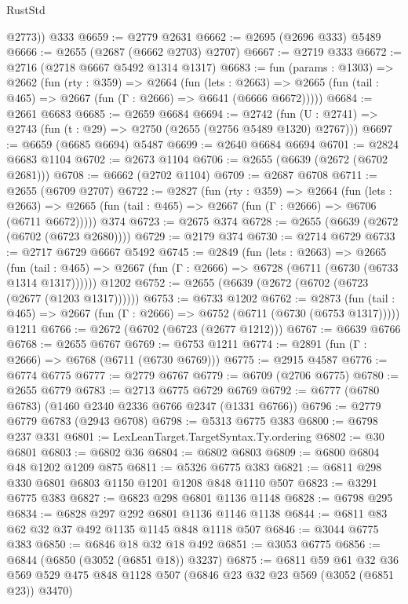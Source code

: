 \begin{lexlean}{RustStd}
\begin{coremodule}
        @2773))
    @333
@6659 := @2779 @2631
@6662 := @2695 (@2696 @333) @5489
@6666 := @2655 (@2687 (@6662 @2703) @2707)
@6667 := @2719 @333
@6672 := @2716 (@2718 @6667 @5492 @1314 @1317)
@6683 := fun (params : @1303) =>
  @2662
    (fun (rty : @359) =>
    @2664
      (fun (lets : @2663) =>
      @2665 (fun (tail : @465) => @2667 (fun (Γ : @2666) => @6641 (@6666 @6672)))))
@6684 := @2661 @6683
@6685 := @2659 @6684
@6694 := @2742 (fun (U : @2741) => @2743 (fun (t : @29) => @2750 (@2655 (@2756 @5489 @1320) @2767)))
@6697 := @6659 (@6685 @6694) @5487
@6699 := @2640 @6684 @6694
@6701 := @2824 @6683 @1104
@6702 := @2673 @1104
@6706 := @2655 (@6639 (@2672 (@6702 @2681)))
@6708 := @6662 (@2702 @1104)
@6709 := @2687 @6708
@6711 := @2655 (@6709 @2707)
@6722 := @2827
    (fun (rty : @359) =>
    @2664
      (fun (lets : @2663) =>
      @2665 (fun (tail : @465) => @2667 (fun (Γ : @2666) => @6706 (@6711 @6672)))))
    @374
@6723 := @2675 @374
@6728 := @2655 (@6639 (@2672 (@6702 (@6723 @2680))))
@6729 := @2179 @374
@6730 := @2714 @6729
@6733 := @2717 @6729 @6667 @5492
@6745 := @2849
    (fun (lets : @2663) =>
    @2665
      (fun (tail : @465) => @2667 (fun (Γ : @2666) => @6728 (@6711 (@6730 (@6733 @1314 @1317))))))
    @1202
@6752 := @2655 (@6639 (@2672 (@6702 (@6723 (@2677 (@1203 @1317))))))
@6753 := @6733 @1202
@6762 := @2873
    (fun (tail : @465) => @2667 (fun (Γ : @2666) => @6752 (@6711 (@6730 (@6753 @1317)))))
    @1211
@6766 := @2672 (@6702 (@6723 (@2677 @1212)))
@6767 := @6639 @6766
@6768 := @2655 @6767
@6769 := @6753 @1211
@6774 := @2891 (fun (Γ : @2666) => @6768 (@6711 (@6730 @6769)))
@6775 := @2915 @4587
@6776 := @6774 @6775
@6777 := @2779 @6767
@6779 := @6709 (@2706 @6775)
@6780 := @2655 @6779
@6783 := @2713 @6775 @6729 @6769
@6792 := @6777 (@6780 @6783) (@1460 @2340 @2336 @6766 @2347 (@1331 @6766))
@6796 := @2779 @6779 @6783 (@2943 @6708)
@6798 := @5313 @6775 @383
@6800 := @6798 @237 @331
@6801 := LexLeanTarget.TargetSyntax.Ty.ordering
@6802 := @30 @6801
@6803 := @6802 @36
@6804 := @6802 @6803
@6809 := @6800 @6804 @48 @1202 @1209 @875
@6811 := @5326 @6775 @383
@6821 := @6811 @298 @330 @6801 @6803 @1150 @1201 @1208 @848 @1110 @507
@6823 := @3291 @6775 @383
@6827 := @6823 @298 @6801 @1136 @1148
@6828 := @6798 @295
@6834 := @6828 @297 @292 @6801 @1136 @1146 @1138
@6844 := @6811 @83 @62 @32 @37 @492 @1135 @1145 @848 @1118 @507
@6846 := @3044 @6775 @383
@6850 := @6846 @18 @32 @18 @492
@6851 := @3053 @6775
@6856 := @6844 (@6850 (@3052 (@6851 @18)) @3237)
@6875 := @6811
    @59
    @61
    @32
    @36
    @569
    @529
    @475
    @848
    @1128
    @507
    (@6846 @23 @32 @23 @569 (@3052 (@6851 @23)) @3470)

\end{coremodule}
\end{lexlean}
